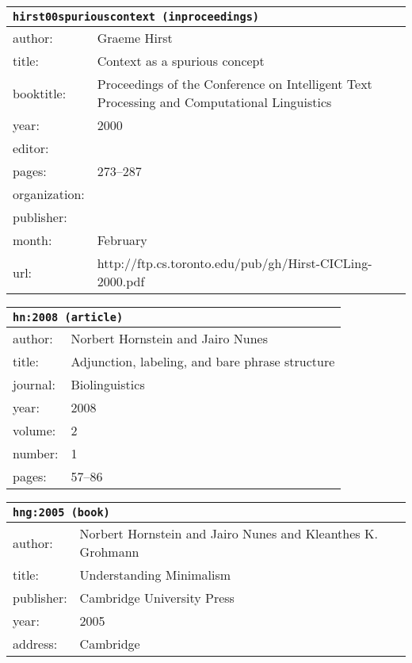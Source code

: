 \documentclass{article}
\begin{document}
\bigskip

\begin{tabular}{p{}p{}}
\multicolumn{2}{l}{\texttt{hirst00spuriouscontext (inproceedings)}}\\
\hline
author: & Graeme Hirst\\
title: & Context as a spurious concept\\
booktitle: & Proceedings of the Conference on Intelligent Text Processing and Computational Linguistics\\
year: & 2000\\
editor: & \\
pages: & 273--287\\
organization: & \\
publisher: & \\
month: & February\\
url: & http://ftp.cs.toronto.edu/pub/gh/Hirst-CICLing-2000.pdf\\
\end{tabular}

\bigskip

\begin{tabular}{p{}p{}}
\multicolumn{2}{l}{\texttt{hn:2008 (article)}}\\
\hline
author: & Norbert Hornstein and Jairo Nunes\\
title: & Adjunction, labeling, and bare phrase structure\\
journal: & Biolinguistics\\
year: & 2008\\
volume: & 2\\
number: & 1\\
pages: & 57--86\\
\end{tabular}

\bigskip

\begin{tabular}{p{}p{}}
\multicolumn{2}{l}{\texttt{hng:2005 (book)}}\\
\hline
author: & Norbert Hornstein and Jairo Nunes and Kleanthes K. Grohmann\\
title: & Understanding Minimalism\\
publisher: & Cambridge University Press\\
year: & 2005\\
address: & Cambridge\\
\end{tabular}
\end{document}
